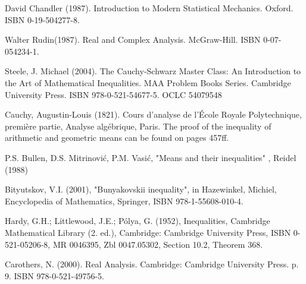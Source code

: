 \documentclass{memoir}
\begin{document}
\begin{thebibliography}{}

David Chandler (1987). Introduction to Modern Statistical Mechanics. Oxford. ISBN 0-19-504277-8.

Walter Rudin(1987). Real and Complex Analysis. McGraw-Hill. ISBN 0-07-054234-1.

Steele, J. Michael (2004). The Cauchy-Schwarz Master Class: An Introduction to the Art of Mathematical Inequalities. MAA Problem Books Series. Cambridge University Press. ISBN 978-0-521-54677-5. OCLC 54079548

Cauchy, Augustin-Louis (1821). Cours d'analyse de l'École Royale Polytechnique, première partie, Analyse algébrique, Paris. The proof of the inequality of arithmetic and geometric means can be found on pages 457ff.

P.S. Bullen, D.S. Mitrinović, P.M. Vasić, "Means and their inequalities" , Reidel (1988)


Bityutskov, V.I. (2001), "Bunyakovskii inequality", in Hazewinkel, Michiel, Encyclopedia of Mathematics, Springer, ISBN 978-1-55608-010-4.

Hardy, G.H.; Littlewood, J.E.; Pólya, G. (1952), Inequalities, Cambridge Mathematical Library (2. ed.), Cambridge: Cambridge University Press, ISBN 0-521-05206-8, MR 0046395, Zbl 0047.05302, Section 10.2, Theorem 368.

Carothers, N. (2000). Real Analysis. Cambridge: Cambridge University Press. p. 9. ISBN 978-0-521-49756-5.


\end{thebibliography}
\end{document}
